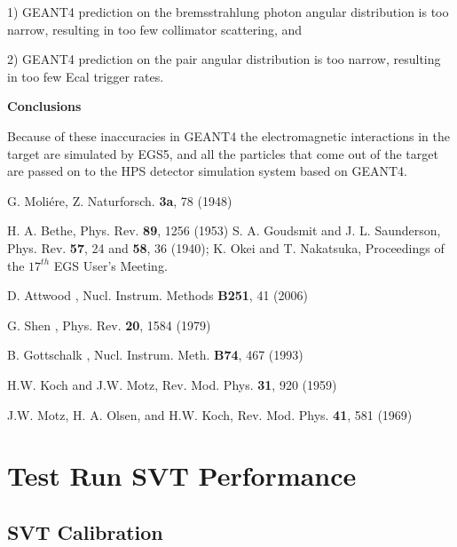1) GEANT4 prediction on the bremsstrahlung photon angular distribution is too narrow, 
resulting in too few collimator scattering, and

2) GEANT4 prediction on the pair angular distribution is too narrow, resulting in 
too few Ecal trigger rates.

\vspace{1cm}
\noindent
{\bf Conclusions}

Because of these inaccuracies in GEANT4 the electromagnetic interactions in the target are simulated 
by EGS5, and all the particles that come out of the target are passed on to the HPS detector 
simulation system based on GEANT4.


\begin{thebibliography}{99}
G. Moli\'{e}re, Z. Naturforsch. {\bf 3a}, 78 (1948)

H. A. Bethe, Phys. Rev. {\bf 89}, 1256 (1953)
S. A. Goudsmit and J. L. Saunderson, Phys. Rev. {\bf 57}, 24 and {\bf 58}, 36 (1940);
K. Okei and T. Nakatsuka, Proceedings of the $17^{th}$ EGS User's Meeting.

D. Attwood \etal, Nucl. Instrum. Methods {\bf B251}, 41 (2006)

G. Shen \etal, Phys. Rev. {\bf 20}, 1584 (1979)

B. Gottschalk \etal, Nucl. Instrum. Meth. {\bf B74}, 467 (1993)

H.W. Koch and J.W. Motz, Rev. Mod. Phys. {\bf 31}, 920 (1959)

J.W. Motz, H. A. Olsen, and H.W. Koch, Rev. Mod. Phys. {\bf 41}, 581 (1969)

\end{thebibliography}



\section{Test Run SVT Performance}
\subsection*{SVT Calibration}



